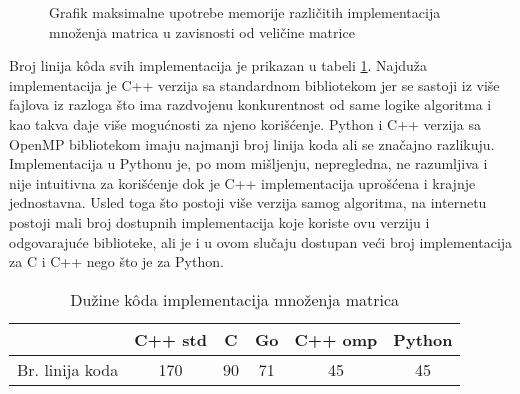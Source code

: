 \documentclass[12pt,oneside]{memoir}
\begin{document}
\begin{figure}
\begin{center}


\caption{Grafik maksimalne upotrebe memorije različitih implementacija množenja matrica u zavisnosti od veličine matrice}
\label{fig:matrix2}
\end{center}
\end{figure}

Broj linija k\^{o}da svih  implementacija je prikazan u tabeli \ref{tab:matrix1}. Najduža implementacija je C++ verzija sa standardnom bibliotekom jer se sastoji iz više fajlova iz razloga što ima razdvojenu konkurentnost od same logike algoritma i kao takva daje više mogućnosti za njeno korišćenje. Python i C++ verzija sa OpenMP bibliotekom imaju najmanji broj linija koda ali se značajno razlikuju. Implementacija u Pythonu je, po mom mišljenju, nepregledna, ne razumljiva i nije intuitivna za korišćenje dok je C++ implementacija uprošćena i krajnje jednostavna. Usled toga što postoji više verzija samog algoritma, na internetu postoji mali broj dostupnih implementacija koje koriste ovu verziju i odgovarajuće biblioteke, ali je i u ovom slučaju dostupan veći broj implementacija za C i C++ nego što je za Python.
 
\begin{table}
\begin{center}
\caption{Dužine k\^{o}da implementacija množenja matrica}
\begin{tabular}{|c|c|c|c|c|c|}
\hline
		& C++ std	&  C 	& Go	& C++ omp	& Python	\\ \hline
Br. linija koda&170		& 90	& 71	&45		&45		\\ \hline
\end{tabular}
\label{tab:matrix1}
\end{center}
\end{table}
\end{document}

